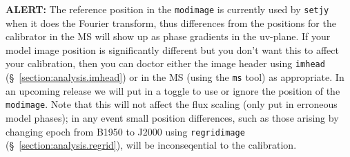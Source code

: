 {\bf ALERT:} The reference position in the {\tt modimage} is 
currently used by {\tt setjy} when it does the Fourier transform,
thus differences from the positions for the calibrator in the MS
will show up as phase gradients in the uv-plane.  If your model
image position is significantly different but you don't want this
to affect your calibration, then you can doctor either the image
header using {\tt imhead} (\S~\ref{section:analysis.imhead})
or in the MS (using the {\tt ms} tool) as appropriate.  In an upcoming
release we will put in a toggle to use or ignore the position of
the {\tt modimage}.  Note that this will not affect the flux scaling
(only put in erroneous model phases); in any event small position
differences, such as those arising by changing epoch from B1950 to
J2000 using {\tt regridimage} (\S~\ref{section:analysis.regrid}),
will be inconseqential to the calibration.

